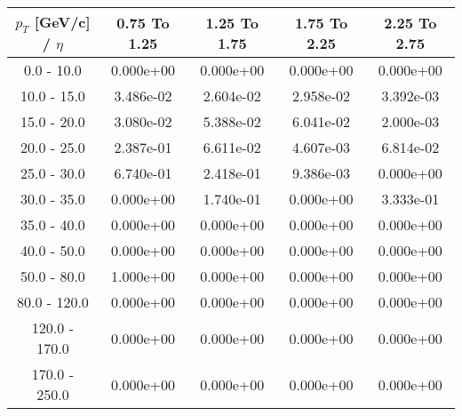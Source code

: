 \begin{tabular}{|c|c|c|c|c|}\hline 
$p_T$ [GeV/c] / $\eta$  & 0.75 To 1.25 & 1.25 To 1.75 & 1.75 To 2.25 & 2.25 To 2.75 \\ 
 \hline 
0.0 - 10.0 & 0.000e+00 & 0.000e+00 & 0.000e+00 & 0.000e+00 \\ 
10.0 - 15.0 & 3.486e-02 & 2.604e-02 & 2.958e-02 & 3.392e-03 \\ 
15.0 - 20.0 & 3.080e-02 & 5.388e-02 & 6.041e-02 & 2.000e-03 \\ 
20.0 - 25.0 & 2.387e-01 & 6.611e-02 & 4.607e-03 & 6.814e-02 \\ 
25.0 - 30.0 & 6.740e-01 & 2.418e-01 & 9.386e-03 & 0.000e+00 \\ 
30.0 - 35.0 & 0.000e+00 & 1.740e-01 & 0.000e+00 & 3.333e-01 \\ 
35.0 - 40.0 & 0.000e+00 & 0.000e+00 & 0.000e+00 & 0.000e+00 \\ 
40.0 - 50.0 & 0.000e+00 & 0.000e+00 & 0.000e+00 & 0.000e+00 \\ 
50.0 - 80.0 & 1.000e+00 & 0.000e+00 & 0.000e+00 & 0.000e+00 \\ 
80.0 - 120.0 & 0.000e+00 & 0.000e+00 & 0.000e+00 & 0.000e+00 \\ 
120.0 - 170.0 & 0.000e+00 & 0.000e+00 & 0.000e+00 & 0.000e+00 \\ 
170.0 - 250.0 & 0.000e+00 & 0.000e+00 & 0.000e+00 & 0.000e+00 \\ 
 \hline 
\end{tabular} 
